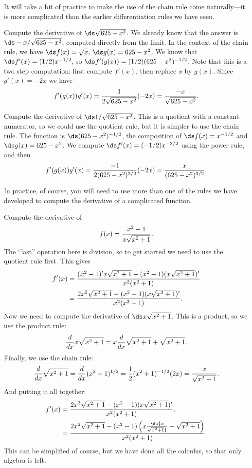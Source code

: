 It will take a bit of practice to make the use of the chain rule come
naturally---it is more complicated than the earlier differentiation
rules we have seen.

\begin{example}
Compute the derivative of $\ds \sqrt{625-x^2}$. We already know that the
answer is $\ds -x/\sqrt{625-x^2}$, computed directly from the limit. In
the context of the chain rule, we have $\ds f(x)=\sqrt{x}$,
$\ds g(x)=625-x^2$. We know that $\ds f'(x)=(1/2)x^{-1/2}$, so $\ds f'(g(x))=
(1/2)(625-x^2)^{-1/2}$. Note that this is a two step computation:
first compute $f'(x)$, then replace $x$ by $g(x)$. Since $g'(x)=-2x$
we have
$$f'(g(x))g'(x)={1\over 2\sqrt{625-x^2}}(-2x)={-x\over
    \sqrt{625-x^2}}.
$$
\vskip-10pt
\end{example}

\begin{example}
Compute the derivative of $\ds 1/\sqrt{625-x^2}$. This is a quotient with
a constant numerator, so we could use the quotient rule, but it is
simpler to use the chain rule. The function is $\ds (625-x^2)^{-1/2}$, the
composition of $\ds f(x)=x^{-1/2}$ and $\ds g(x)=625-x^2$. We compute
$\ds f'(x)=(-1/2)x^{-3/2}$ using the power rule, and then
$$f'(g(x))g'(x)={-1\over 2(625-x^2)^{3/2}}(-2x)={x\over (625-x^2)^{3/2}}.
$$
\vskip-10pt
\end{example}

In practice, of course, you will need to use more than one of the
rules we have developed to compute the derivative of a complicated
function.

\begin{example}
Compute the derivative of $$f(x)={x^2-1\over x\sqrt{x^2+1}}.$$
The ``last'' operation here is division, so to get started we need to
use the quotient rule first. This gives
\begin{align*}
f'(x)&={(x^2-1)'x\sqrt{x^2+1}-(x^2-1)(x\sqrt{x^2+1})'\over
x^2(x^2+1)} \\
&={2x^2\sqrt{x^2+1}-(x^2-1)(x\sqrt{x^2+1})'\over
x^2(x^2+1)}. \\
\end{align*}
Now we need to compute the derivative of $\ds x\sqrt{x^2+1}$. This is a
product, so we use the product rule:
$${d\over dx}x\sqrt{x^2+1}=x{d\over dx}\sqrt{x^2+1}+\sqrt{x^2+1}.$$
Finally, we use the chain rule:
$${d\over dx}\sqrt{x^2+1}={d\over dx}(x^2+1)^{1/2}=
{1\over 2}(x^2+1)^{-1/2}(2x)={x\over \sqrt{x^2+1}}.$$
And putting it all together:
\begin{align*}
f'(x)&={2x^2\sqrt{x^2+1}-(x^2-1)(x\sqrt{x^2+1})'\over
x^2(x^2+1)}. \\
&={2x^2\sqrt{x^2+1}-(x^2-1)\left(x{\ds{x\over \sqrt{x^2+1}}}
+\sqrt{x^2+1}\right)\over
x^2(x^2+1)}. \\
\end{align*}
This can be simplified of course, but we have done all the calculus,
so that only algebra is left.
\end{example}


